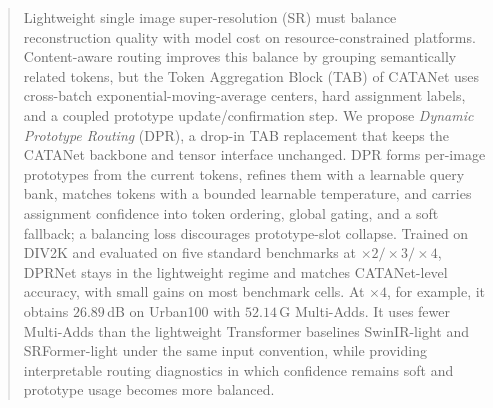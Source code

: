 \begin{abstract}
Lightweight single image super-resolution (SR) must balance reconstruction quality with
model cost on resource-constrained platforms. Content-aware routing improves this balance
by grouping semantically related tokens, but the Token Aggregation Block (TAB) of CATANet
uses cross-batch exponential-moving-average centers, hard assignment labels, and a coupled
prototype update/confirmation step. We propose \emph{Dynamic Prototype Routing} (DPR), a
drop-in TAB replacement that keeps the CATANet backbone and tensor interface unchanged.
DPR forms per-image prototypes from the current tokens, refines them with a learnable
query bank, matches tokens with a bounded learnable temperature, and carries assignment
confidence into token ordering, global gating, and a soft fallback; a balancing loss
discourages prototype-slot collapse. Trained on DIV2K and evaluated on five standard
benchmarks at $\times2/\times3/\times4$, DPRNet stays in the lightweight regime and
matches CATANet-level accuracy, with small gains on most benchmark cells. At $\times4$,
for example, it obtains $26.89$\,dB on Urban100 with $52.14$\,G Multi-Adds. It uses fewer
Multi-Adds than the lightweight Transformer baselines SwinIR-light and SRFormer-light
under the same input convention, while providing interpretable routing diagnostics in
which confidence remains soft and prototype usage becomes more balanced.
\end{abstract}
